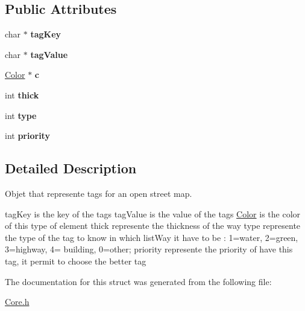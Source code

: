 \subsection*{Public Attributes}
\begin{DoxyCompactItemize}
\item 
\hypertarget{structTag_a9e91de69887dba3f1a2e9d532acbce8b}{char $\ast$ {\bfseries tag\-Key}}\label{structTag_a9e91de69887dba3f1a2e9d532acbce8b}

\item 
\hypertarget{structTag_ace008f9a4f15d8128de404a0c920ab0d}{char $\ast$ {\bfseries tag\-Value}}\label{structTag_ace008f9a4f15d8128de404a0c920ab0d}

\item 
\hypertarget{structTag_a6805504ea08ce816b95c5441f7485348}{\hyperlink{structColor}{Color} $\ast$ {\bfseries c}}\label{structTag_a6805504ea08ce816b95c5441f7485348}

\item 
\hypertarget{structTag_a6456de00a94753379709078b718a8724}{int {\bfseries thick}}\label{structTag_a6456de00a94753379709078b718a8724}

\item 
\hypertarget{structTag_acd71a132bb412efeccfbc87b3cc25787}{int {\bfseries type}}\label{structTag_acd71a132bb412efeccfbc87b3cc25787}

\item 
\hypertarget{structTag_af4bf844100277f4167d6cbe2d83d879d}{int {\bfseries priority}}\label{structTag_af4bf844100277f4167d6cbe2d83d879d}

\end{DoxyCompactItemize}


\subsection{Detailed Description}
Objet that represente tags for an open street map. 

tag\-Key is the key of the tags tag\-Value is the value of the tags \hyperlink{structColor}{Color} is the color of this type of element thick represente the thickness of the way type represente the type of the tag to know in which list\-Way it have to be \-: 1=water, 2=green, 3=highway, 4= building, 0=other; priority represente the priority of have this tag, it permit to choose the better tag 

The documentation for this struct was generated from the following file\-:\begin{DoxyCompactItemize}
\item 
\hyperlink{Core_8h}{Core.\-h}\end{DoxyCompactItemize}
